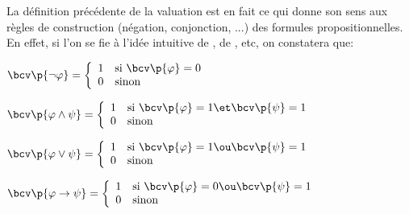     La définition précédente de la valuation est en fait ce qui donne son sens aux règles de construction (négation, conjonction, ...) des formules propositionnelles. En effet, si l'on se fie à l'idée intuitive de , de , etc, on constatera que:
    \begin{enumerate}
        \begin{minipage}{0.45\linewidth}
            \itt $\bcv\p{\neg \varphi} = \left\lbrace\begin{array}{cl}
                1 &\text{si} \ \bcv\p{\varphi} = 0 \\
                0 &\text{sinon}
            \end{array}\right.$
        
            \itt $\bcv\p{\varphi \land \psi} = \left\lbrace\begin{array}{cl}
                1 &\text{si} \ \bcv\p{\varphi} = 1 \et \bcv\p{\psi} = 1 \\
                0 &\text{sinon}
            \end{array}\right.$
        \end{minipage}
        \hfill
        \begin{minipage}{0.45\linewidth}
            \itt $\bcv\p{\varphi \lor \psi} = \left\lbrace\begin{array}{cl}
                1 &\text{si} \ \bcv\p{\varphi} = 1 \ou \bcv\p{\psi} = 1 \\
                0 &\text{sinon}
            \end{array}\right.$
        
            \itt $\bcv\p{\varphi \rightarrow \psi} =  \left\lbrace\begin{array}{cl}
                1 &\text{si} \ \bcv\p{\varphi} = 0 \ou \bcv\p{\psi} = 1 \\
                0 &\text{sinon}
            \end{array}\right.$
        \end{minipage}
    \end{enumerate}
    
